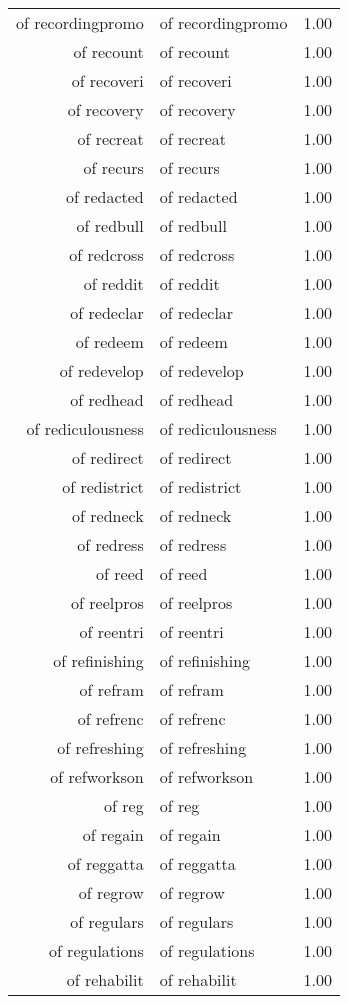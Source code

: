 \begin{table}[ht]
\begin{tabular}{rlr}
  of recordingpromo & of recordingpromo & 1.00 \\ 
  of recount & of recount & 1.00 \\ 
  of recoveri & of recoveri & 1.00 \\ 
  of recovery & of recovery & 1.00 \\ 
  of recreat & of recreat & 1.00 \\ 
  of recurs & of recurs & 1.00 \\ 
  of redacted & of redacted & 1.00 \\ 
  of redbull & of redbull & 1.00 \\ 
  of redcross & of redcross & 1.00 \\ 
  of reddit & of reddit & 1.00 \\ 
  of redeclar & of redeclar & 1.00 \\ 
  of redeem & of redeem & 1.00 \\ 
  of redevelop & of redevelop & 1.00 \\ 
  of redhead & of redhead & 1.00 \\ 
  of rediculousness & of rediculousness & 1.00 \\ 
  of redirect & of redirect & 1.00 \\ 
  of redistrict & of redistrict & 1.00 \\ 
  of redneck & of redneck & 1.00 \\ 
  of redress & of redress & 1.00 \\ 
  of reed & of reed & 1.00 \\ 
  of reelpros & of reelpros & 1.00 \\ 
  of reentri & of reentri & 1.00 \\ 
  of refinishing & of refinishing & 1.00 \\ 
  of refram & of refram & 1.00 \\ 
  of refrenc & of refrenc & 1.00 \\ 
  of refreshing & of refreshing & 1.00 \\ 
  of refworkson & of refworkson & 1.00 \\ 
  of reg & of reg & 1.00 \\ 
  of regain & of regain & 1.00 \\ 
  of reggatta & of reggatta & 1.00 \\ 
  of regrow & of regrow & 1.00 \\ 
  of regulars & of regulars & 1.00 \\ 
  of regulations & of regulations & 1.00 \\ 
  of rehabilit & of rehabilit & 1.00 \\ 

\end{tabular}
\end{table}
